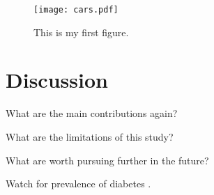 \documentclass[12pt]{article}
\begin{document}
\begin{figure}[tbp]
  \centering
  \texttt{[image: cars.pdf]}
  \caption{This is my first figure.}
  \label{fig:cars}
\end{figure}

\section{Discussion}
\label{sec:disc}

What are the main contributions again?

What are the limitations of this study?

What are worth pursuing further in the future?

\lipsum[1-2]
Watch for prevalence of diabetes \citep{wild2004global}.



\end{document}
